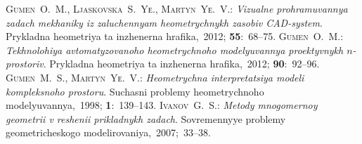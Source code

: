 \documentclass[12pt,twoside]{article}
\begin{document}
\begin{JGGarticle}
\begin{thebibliography}{99}
				{\scshape Gumen~O.~M., Ljaskovska~S.~Yе., Martyn~Yе.~V.}:
				{\itshape Vizualne prohramuvannya zadach mekhaniky iz zaluchennyam heometrychnykh zasobiv CAD-system}.
				Prykladna heometriya ta inzhenerna hrafika,~2012; \textbf{55}:~68--75.
				{\scshape Gumen~O.~M.}:
				{\itshape Tekhnolohiya avtomatyzovanoho heometrychnoho modelyuvannya proektyvnykh $n$-prostoriv}.
				Prykladna heometriya ta inzhenerna hrafika,~2012; \textbf{90}:~92--96.
				{\scshape Gumen~M.~S., Martyn~Yе.~V.}:
				{\itshape Heometrychna interpretatsiya modeli kompleksnoho  prostoru}.
				Suchasni problemy heometrychnoho modelyuvannya,~1998; \textbf{1}:~139--143.
				{\scshape Ivanov~G.~S.}:
				{\itshape Metody mnogomernoy geometrii v reshenii prikladnykh zadach}.
				Sovremennyye problemy geometricheskogo modelirovaniya,~2007;~33--38.
		\end{thebibliography}
	\end{JGGarticle}
\end{document}
